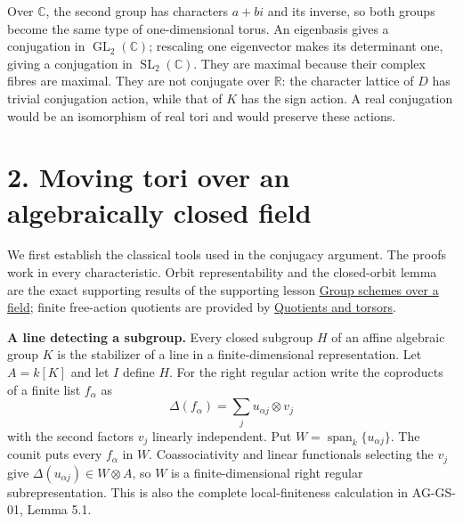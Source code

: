 \documentclass[11pt,a4paper,openany]{report}
\begin{document}
Over \(\mathbb C\), the second group has characters \(a+bi\) and its inverse, so both groups become the same type of one-dimensional torus. An eigenbasis gives a conjugation in \(\operatorname{GL}_2(\mathbb C)\); rescaling one eigenvector makes its determinant one, giving a conjugation in \(\operatorname{SL}_2(\mathbb C)\). They are maximal because their complex fibres are maximal. They are not conjugate over \(\mathbb R\): the character lattice of \(D\) has trivial conjugation action, while that of \(K\) has the sign action. A real conjugation would be an isomorphism of real tori and would preserve these actions.

\section{2. Moving tori over an algebraically closed field}\label{AG-RG-01-moving-tori-over-an-algebraically-closed-field}

We first establish the classical tools used in the conjugacy argument. The proofs work in every characteristic. Orbit representability and the closed-orbit lemma are the exact supporting results of the supporting lesson \href{https://github.com/KokunoYumeto/open-math-courses/blob/main/docs/courses/AG-GS/AG-GS-03.html}{Group schemes over a field}; finite free-action quotients are provided by \href{https://github.com/KokunoYumeto/open-math-courses/blob/main/docs/courses/AG-GS/AG-GS-04.html}{Quotients and torsors}.

\textbf{A line detecting a subgroup.} Every closed subgroup \(H\) of an affine algebraic group \(K\) is the stabilizer of a line in a finite-dimensional representation. Let \(A=k[K]\) and let \(I\) define \(H\). For the right regular action write the coproducts of a finite list \(f_\alpha\) as \[
\Delta(f_\alpha)=\sum_j u_{\alpha j}\otimes v_j
\] with the second factors \(v_j\) linearly independent. Put \(W=\operatorname{span}_k\{u_{\alpha j}\}\). The counit puts every \(f_\alpha\) in \(W\). Coassociativity and linear functionals selecting the \(v_j\) give \(\Delta(u_{\alpha j})\in W\otimes A\), so \(W\) is a finite-dimensional right regular subrepresentation. This is also the complete local-finiteness calculation in AG-GS-01, Lemma 5.1.
\end{document}
